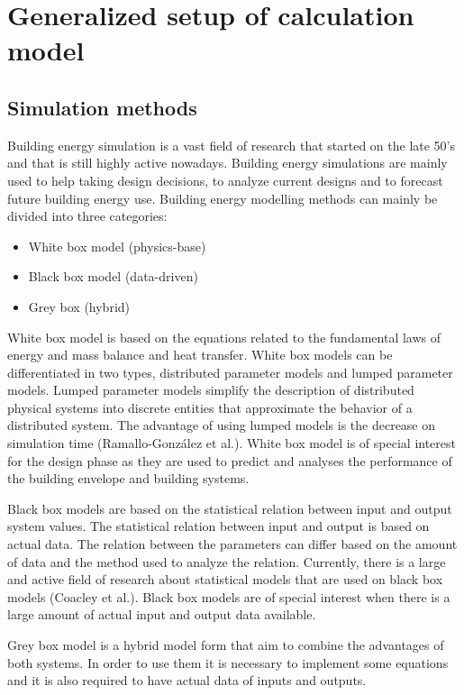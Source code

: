 \section{Generalized setup of calculation model}

\subsection{Simulation methods}

Building energy simulation is a vast field of research that started on the late 50’s and that is still highly active nowadays. Building energy simulations are mainly used to help taking design decisions, to analyze current designs and to forecast future building energy use. Building energy modelling methods can mainly be divided into three categories: 

\begin{itemize}
    \item White box model (physics-base) 
    \item Black box model (data-driven) 
    \item Grey box (hybrid) 

\end{itemize}
White box model is based on the equations related to the fundamental laws of energy and mass balance and heat transfer. White box models can be differentiated in two types, distributed parameter models and lumped parameter models. Lumped parameter models simplify the description of distributed physical systems into discrete entities that approximate the behavior of a distributed system. The advantage of using lumped models is the decrease on simulation time (Ramallo-González et al.). White box model is of special interest for the design phase as they are used to predict and analyses the performance of the building envelope and building systems.

Black box models are based on the statistical relation between input and output system values. The statistical relation between input and output is based on actual data. The relation between the parameters can differ based on the amount of data and the method used to analyze the relation. Currently, there is a large and active field of research about statistical models that are used on black box models (Coacley et al.). Black box models are of special interest when there is a large amount of actual input and output data available.   

Grey box model is a hybrid model form that aim to combine the advantages of both systems. In order to use them it is necessary to implement some equations and it is also required to have actual data of inputs and outputs. 

